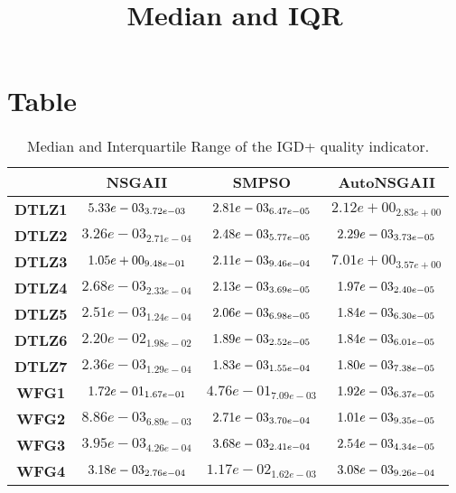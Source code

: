 \documentclass{article}
\title{Median and IQR}
\author{}
\begin{document}
\maketitle
\section{Table}
\begin{table}[!htp]
  \caption{Median and Interquartile Range of the IGD+ quality indicator.}
  \label{table:IGD+}
  \centering
  \begin{scriptsize}
  \begin{tabular}{c|ccc}
      & \textbf{NSGAII} & \textbf{SMPSO} & \textbf{AutoNSGAII} \\\hline
      \textbf{DTLZ1} & $\cellcolor{gray25} 5.33e-03_{3.72e-03} $ & $ \cellcolor{gray95} 2.81e-03_{6.47e-05} $ & $ 2.12e+00_{2.83e+00}$ \\
      \textbf{DTLZ2} & $3.26e-03_{2.71e-04} $ & $ \cellcolor{gray25} 2.48e-03_{5.77e-05} $ & $ \cellcolor{gray95} 2.29e-03_{3.73e-05}$ \\
      \textbf{DTLZ3} & $\cellcolor{gray25} 1.05e+00_{9.48e-01} $ & $ \cellcolor{gray95} 2.11e-03_{9.46e-04} $ & $ 7.01e+00_{3.57e+00}$ \\
      \textbf{DTLZ4} & $2.68e-03_{2.33e-04} $ & $ \cellcolor{gray25} 2.13e-03_{3.69e-05} $ & $ \cellcolor{gray95} 1.97e-03_{2.40e-05}$ \\
      \textbf{DTLZ5} & $2.51e-03_{1.24e-04} $ & $ \cellcolor{gray25} 2.06e-03_{6.98e-05} $ & $ \cellcolor{gray95} 1.84e-03_{6.30e-05}$ \\
      \textbf{DTLZ6} & $2.20e-02_{1.98e-02} $ & $ \cellcolor{gray25} 1.89e-03_{2.52e-05} $ & $ \cellcolor{gray95} 1.84e-03_{6.01e-05}$ \\
      \textbf{DTLZ7} & $2.36e-03_{1.29e-04} $ & $ \cellcolor{gray25} 1.83e-03_{1.55e-04} $ & $ \cellcolor{gray95} 1.80e-03_{7.38e-05}$ \\
      \textbf{WFG1} & $\cellcolor{gray25} 1.72e-01_{1.67e-01} $ & $ 4.76e-01_{7.09e-03} $ & $ \cellcolor{gray95} 1.92e-03_{6.37e-05}$ \\
      \textbf{WFG2} & $8.86e-03_{6.89e-03} $ & $ \cellcolor{gray25} 2.71e-03_{3.70e-04} $ & $ \cellcolor{gray95} 1.01e-03_{9.35e-05}$ \\
      \textbf{WFG3} & $3.95e-03_{4.26e-04} $ & $ \cellcolor{gray25} 3.68e-03_{2.41e-04} $ & $ \cellcolor{gray95} 2.54e-03_{4.34e-05}$ \\
      \textbf{WFG4} & $\cellcolor{gray25} 3.18e-03_{2.76e-04} $ & $ 1.17e-02_{1.62e-03} $ & $ \cellcolor{gray95} 3.08e-03_{9.26e-04}$ \\

\end{tabular}
\end{scriptsize}
\end{table}
\end{document}
